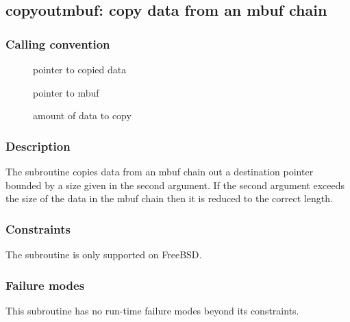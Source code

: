 \clearpage
{}
{}
\label{subr:copyoutmbuf}
\subsection*{copyoutmbuf: copy data from an mbuf chain}

\subsubsection*{Calling convention}

\begin{description}
\item[] pointer to copied data
\item[] pointer to mbuf
\item[] amount of data to copy
\end{description}

\subsubsection*{Description}

The  subroutine copies data from an mbuf
chain out a destination pointer bounded by a size given in the second
argument.  If the second argument exceeds the size of the data in the
mbuf chain then it is reduced to the correct length.

\subsubsection*{Constraints}

The  subroutine is only supported on FreeBSD.

\subsubsection*{Failure modes}

This subroutine has no run-time failure modes beyond its constraints.

